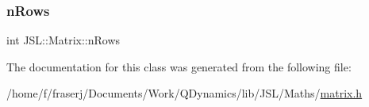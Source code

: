 \mbox{\label{classJSL_1_1Matrix_a7b7a081bbf419b613f19142a634b2cfa}} 
\subsubsection{\texorpdfstring{n\+Rows}{nRows}}
{\footnotesize\ttfamily int J\+S\+L\+::\+Matrix\+::n\+Rows\hspace{0.3cm}{\ttfamily [private]}}



The documentation for this class was generated from the following file\+:\begin{DoxyCompactItemize}
\item 
/home/f/fraserj/\+Documents/\+Work/\+Q\+Dynamics/lib/\+J\+S\+L/\+Maths/\hyperlink{matrix_8h}{matrix.\+h}\end{DoxyCompactItemize}
